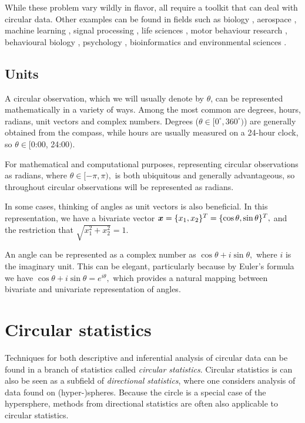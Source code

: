 \documentclass[12pt, a4paper]{book}\usepackage[]{graphicx}\usepackage[]{color}
\begin{document}
While these problem vary wildly in flavor, all require a toolkit that can deal with circular data. Other examples can be found in fields such as biology \citep{nunez2018bayesian}, aerospace \citep{kurz2017deterministic},  machine learning \citep{gopal2014mises}, signal processing \citep{traa2013wrapped}, life sciences \citep{mardianew}, motor behaviour research \citep{mechsner2001perceptual, mechsner2007bimanual, postma2008keep, baayen2012test}, behavioural biology \citep{bulbert2015danger}, psychology \citep{Leary1957, gurtman2003circumplex, kaas2006haptic,  gurtman2009exploring}, bioinformatics \citep{mardia2008multivariate} and environmental sciences \citep{lagona2016regression, lagona2015hidden, arnold2006recent}.



\subsection{Units}

A circular observation, which we will usually denote by $\theta$, can be represented mathematically in a variety of ways. Among the most common are degrees, hours, radians, unit vectors and complex numbers. Degrees ($\theta \in [0^\circ, 360^\circ)$) are generally obtained from the compass, while hours are usually measured on a 24-hour clock, so $\theta \in [$0:00, 24:00$)$.

For mathematical and computational purposes, representing circular observations as radians, where $\theta \in [-\pi, \pi),$ is both ubiquitous and generally advantageous, so throughout circular observations will be represented as radians.

In some cases, thinking of angles as unit vectors is also beneficial. In this representation, we have a bivariate vector $\boldsymbol{x} = \{x_1, x_2\}^T = \{\cos\theta, \sin\theta\}^T,$ and the restriction that $\sqrt{x_1^2 + x_2^2} = 1.$

An angle can be represented as a complex number as $\cos\theta + i \sin \theta,$ where $i$ is the imaginary unit. This can be elegant, particularly because by Euler's formula we have $\cos\theta + i \sin \theta = e^{i\theta},$ which provides a natural mapping between bivariate and univariate representation of angles.


\section{Circular statistics}

Techniques for both descriptive and inferential analysis of circular data can be found in a branch of statistics called \textit{circular statistics}. Circular statistics is can also be seen as a subfield of \textit{directional statistics}, where one considers analysis of data found on (hyper-)spheres. Because the circle is a special case of the hypersphere, methods from directional statistics are often also applicable to circular statistics.
\end{document}
